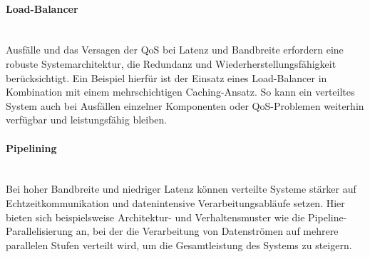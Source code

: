 \documentclass[../vs-script-first-v01.tex]{subfiles}
\begin{document}
\paragraph{Load-Balancer \\\\}
Ausfälle und das Versagen der QoS bei Latenz und Bandbreite erfordern eine robuste Systemarchitektur, die Redundanz und Wiederherstellungsfähigkeit berücksichtigt. Ein Beispiel hierfür ist der Einsatz eines Load-Balancer in Kombination mit einem mehrschichtigen Caching-Ansatz. So kann ein verteiltes System auch bei Ausfällen einzelner Komponenten oder QoS-Problemen weiterhin verfügbar und leistungsfähig bleiben.
\paragraph{Pipelining \\\\}
Bei hoher Bandbreite und niedriger Latenz können verteilte Systeme stärker auf Echtzeitkommunikation und datenintensive Verarbeitungsabläufe setzen. Hier bieten sich beispielsweise Architektur- und Verhaltensmuster wie die Pipeline-Parallelisierung an, bei der die Verarbeitung von Datenströmen auf mehrere parallelen Stufen verteilt wird, um die Gesamtleistung des Systems zu steigern.
\end{document}
